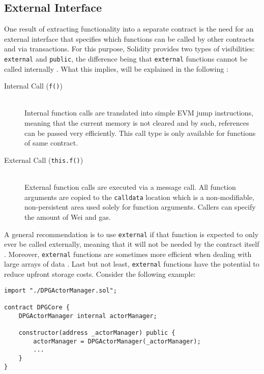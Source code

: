 \subsection{External Interface}
One result of extracting functionality into a separate contract is the need for an external interface that specifies which functions can be called by other contracts and via transactions. For this purpose, Solidity provides two types of visibilities: \texttt{external} and \texttt{public}, the difference being that \texttt{external} functions cannot be called internally \cite[p.~77]{solidityDocs}. What this implies, will be explained in the following \cite[pp.~57, 69]{solidityDocs}:

\begin{description}
	\item[Internal Call (\texttt{f()})]
	\hfill \\
	Internal function calls are translated into simple \ac{EVM} jump instructions, meaning that the current memory is not cleared and by such, references can be passed very efficiently. This call type is only available for functions of same contract. 
	\item[External Call (\texttt{this.f()})]
	\hfill \\
	External function calls are executed via a message call. All function arguments are copied to the \texttt{calldata} location which is a non-modifiable, non-persistent area used solely for function arguments. Callers can specify the amount of Wei and gas. 
\end{description}

A general recommendation is to use \texttt{external} if that function is expected to only ever be called externally, meaning that it will not be needed by the contract itself \cite{externalPublic}. Moreover, \texttt{external} functions are sometimes more efficient when dealing with large arrays of data \cite[p.~77]{solidityDocs}. Last but not least, \texttt{external} functions have the potential to reduce upfront storage costs. Consider the following example:

\begin{lstlisting}[language=Solidity, caption=Communication via inheritance, label=lst:actorManagerReference]
import "./DPGActorManager.sol";

contract DPGCore {
	DPGActorManager internal actorManager;
	
	constructor(address _actorManager) public {
        actorManager = DPGActorManager(_actorManager);
        ...
    }
}
\end{lstlisting}

